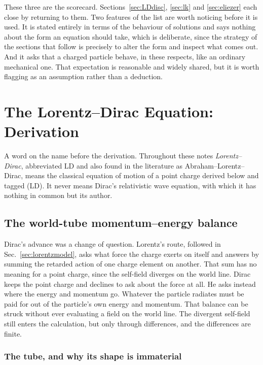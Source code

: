 \documentclass[preprint]{aastex701}
\begin{document}
These three are the scorecard. Sections~\ref{sec:LDdisc}, \ref{sec:lk} and
\ref{sec:eliezer} each close by returning to them. Two features of the list are
worth noticing before it is used. It is stated entirely in terms of the
behaviour of solutions and says nothing about the form an equation should take,
which is deliberate, since the strategy of the sections that follow is precisely
to alter the form and inspect what comes out. And it asks that a charged
particle behave, in these respects, like an ordinary mechanical one. That
expectation is reasonable and widely shared, but it is worth flagging as an
assumption rather than a deduction.

\section{The Lorentz--Dirac Equation: Derivation}
\label{sec:LDderiv}

A word on the name before the derivation. Throughout these notes
\emph{Lorentz--Dirac}, abbreviated LD and also found in the literature as
Abraham--Lorentz--Dirac, means the classical equation of motion of a point
charge derived below and tagged (LD). It never means Dirac's relativistic wave
equation, with which it has nothing in common but its author.

\subsection{The world-tube momentum--energy balance}
\label{sec:tube}



Dirac's advance was a change of question. Lorentz's route, followed in
Sec.~\ref{sec:lorentzmodel}, asks what force the charge exerts on itself and
answers by summing the retarded action of one charge element on another. That
sum has no meaning for a point charge, since the self-field diverges on the
world line. Dirac keeps the point charge and declines to ask about the force at
all. He asks instead where the energy and momentum go. Whatever the particle
radiates must be paid for out of the particle's own energy and momentum. That
balance can be struck without ever evaluating a field on the world line.
The divergent self-field still enters the calculation, but only through
differences, and the differences are finite.

\subsubsection{The tube, and why its shape is immaterial}
\label{sec:tubeindep}
\end{document}
